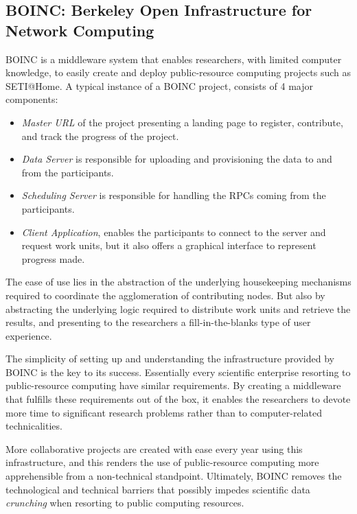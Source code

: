 \documentclass[12pt, titlepage]{uo_temp}
\begin{document}
     \subsection{BOINC: Berkeley Open Infrastructure for Network Computing}
     BOINC \cite{anderson2004boinc} is a middleware system that enables researchers, with limited
     computer knowledge, to easily create and deploy public-resource computing projects such as
     SETI@Home.
     A typical instance of a BOINC project, consists of 4 major components:
     \begin{itemize}
       \item \emph{Master URL} of the project presenting a landing page to register,
         contribute, and track the progress of the project.
       \item \emph{Data Server} is responsible for uploading and provisioning the data to
         and from the participants.
       \item \emph{Scheduling Server} is responsible for handling the RPCs coming from the
         participants.
       \item \emph{Client Application}, enables the participants to connect to the server
         and request work units, but it also offers a graphical interface to represent
         progress made.
     \end{itemize}   
     The ease of use lies in the abstraction of the underlying housekeeping mechanisms required to
     coordinate the agglomeration of contributing nodes. But also by abstracting the underlying
     logic required to distribute work units and retrieve the results, and presenting to
     the researchers a fill-in-the-blanks type of user experience.

     The simplicity of setting up and understanding the infrastructure provided by BOINC
     is the key to its success. Essentially every scientific enterprise resorting to
     public-resource computing have similar requirements. By creating a middleware that
     fulfills these requirements out of the box, it enables the researchers to devote more
     time to significant research problems rather than to computer-related technicalities.  

     More collaborative projects are created with ease every year using this
     infrastructure, and this renders the use of public-resource computing more
     apprehensible from a non-technical standpoint. Ultimately, BOINC removes the
     technological and technical barriers that possibly impedes scientific data
     \emph{crunching} when resorting to public computing resources.
\end{document}
